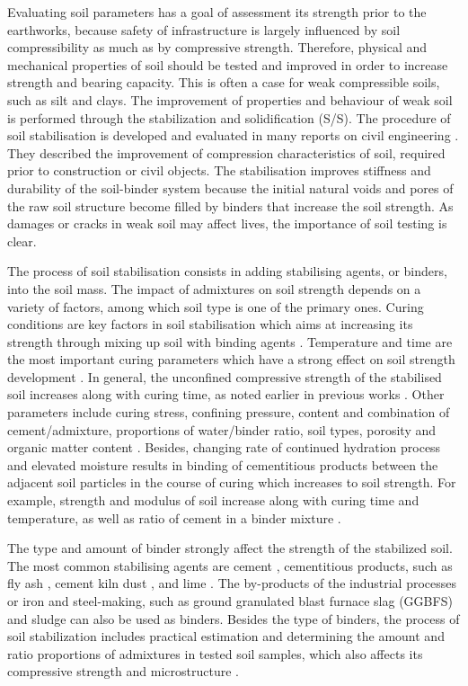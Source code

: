 \documentclass{amestyle}
\begin{document}
Evaluating soil parameters has a goal of assessment its strength prior to the earthworks, because safety of infrastructure is largely influenced by soil compressibility as much as by compressive strength. Therefore, physical and mechanical properties of soil should be tested and improved in order to increase strength and bearing capacity. This is often a case for weak compressible soils, such as silt and clays. The improvement of properties and behaviour of weak soil is performed through the stabilization and solidification (S/S). The procedure of soil stabilisation is developed and evaluated in many reports on civil engineering \cite{Jauberthie,Lindh202102,ArabiWild,Lindh2004}. They described the improvement of compression characteristics of soil, required prior to construction or civil objects. The stabilisation improves stiffness and durability of the soil-binder system because the initial natural voids and pores of the raw soil structure become filled by binders that increase the soil strength. As damages or cracks in weak soil may affect lives, the importance of soil testing is clear. 

The process of soil stabilisation consists in adding stabilising agents, or binders, into the soil mass. The impact of admixtures on soil strength depends on a variety of factors, among which soil type is one of the primary ones. Curing conditions are key factors in soil stabilisation which aims at increasing its strength through mixing up soil with binding agents \cite{LiuStarcher,Oliveiraetal2012,Ghasemzadeh}. Temperature and time are the most important curing parameters which have a strong effect on soil strength development \cite{Aldaood,Yuetal2017,Oh}. In general, the unconfined compressive strength of the stabilised soil increases along with curing time, as noted earlier in previous works \cite{Howard,Lindh202102,Consoli}. Other parameters include curing stress, confining pressure, content and combination of cement/admixture, proportions of water/binder ratio, soil types, porosity and organic matter content \cite{Rabbi,CHAIYAPUT2022e01082,Lindh2022,AMADI2018305}. Besides, changing rate of continued hydration process and elevated moisture results in binding of cementitious products between the adjacent soil particles in the course of curing which increases to soil strength. For example, strength and modulus of soil increase along with curing time and temperature, as well as ratio of cement in a binder mixture \cite{Wangetal2017}. 

The type and amount of binder strongly affect the strength of the stabilized soil. The most common stabilising agents are cement \cite{Rekik}, cementitious products, such as fly ash \cite{Tastan,Hasan}, cement kiln dust \cite{Solanki,Lindh2021a}, and lime \cite{ARULRAJAH2017999,BIAN20211124,ANDAVAN20201125,INDIRAMMA2020694}. The by-products of the industrial processes or iron and steel-making, such as ground granulated blast furnace slag (GGBFS) \cite{Mozejko} and sludge \cite{Ingunza,Sharif} can also be used as binders. Besides the type of binders, the process of soil stabilization includes practical estimation and determining the amount and ratio proportions of admixtures in tested soil samples, which also affects its compressive strength and microstructure \cite{Lindh2001,Ahmed}.
\end{document}
